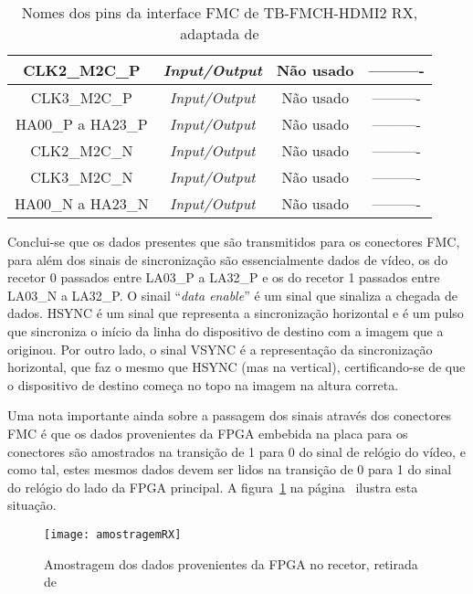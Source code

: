 \begin{enumerate}
\begin{table}[h!]
\begin{tabular}{|c|c|c|c|}
			CLK2\_M2C\_P         & \textit{Input/Output}          & Não usado              & ----------                     \\ \hline
			CLK3\_M2C\_P         & \textit{Input/Output}          & Não usado              & ----------                     \\ \hline
			HA00\_P a HA23\_P    & \textit{Input/Output}          & Não usado              & ----------                     \\ \hline
			CLK2\_M2C\_N         & \textit{Input/Output}          & Não usado              & ----------                     \\ \hline
			CLK3\_M2C\_N         & \textit{Input/Output}          & Não usado              & ----------                     \\ \hline
			HA00\_N a HA23\_N    & \textit{Input/Output}          & Não usado              & ----------                     \\ \hline
		\end{tabular}
		\caption{Nomes dos pins da interface FMC de TB-FMCH-HDMI2 RX, adaptada de \cite{R009}}
		\label{table:HDMIdataRX}
	\end{table}

\hspace{1.0em}Conclui-se que os dados presentes que são transmitidos para os conectores FMC, para além dos sinais de sincronização são essencialmente dados de vídeo, os do recetor 0 passados entre LA03\_P a LA32\_P e os do recetor 1 passados entre LA03\_N a LA32\_P. O sinail “\textit{data enable}” é um sinal que sinaliza a chegada de dados. HSYNC é um sinal que representa a sincronização horizontal e é um pulso que sincroniza o início da linha do dispositivo de destino com a imagem que a originou. Por outro lado, o sinal VSYNC é a representação da sincronização horizontal, que faz o mesmo que HSYNC (mas na vertical), certificando-se de que o dispositivo de destino começa no topo na imagem na altura correta.

\hspace{1.0em}Uma nota importante ainda sobre a passagem dos sinais através dos conectores FMC é que os dados provenientes da FPGA embebida na placa para os conectores são amostrados na transição de 1 para 0 do sinal de relógio do vídeo, e como tal, estes mesmos dados devem ser lidos na transição de 0 para 1 do sinal do relógio do lado da FPGA principal. A figura~\ref{fig:HDMIamostragemRX} na página~\pageref{fig:HDMIamostragemRX} ilustra esta situação.

\begin{figure}[h!]
	\begin{center}
		\leavevmode
		\texttt{[image: amostragemRX]}
		\caption{Amostragem dos dados provenientes da FPGA no recetor, retirada de \cite{R009}}
		\label{fig:HDMIamostragemRX}
	\end{center}
\end{figure}
 
\end{enumerate}

